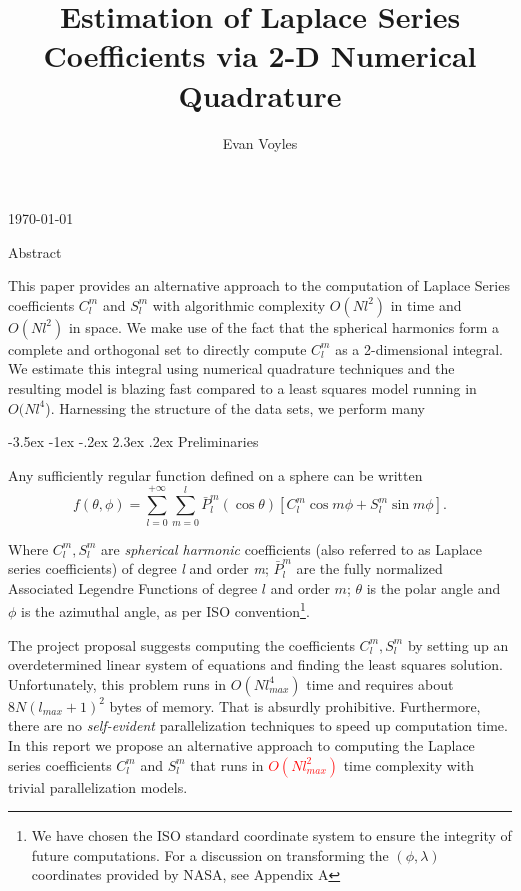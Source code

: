 \documentclass[a4paper]{article}
\title{\Large Estimation of Laplace Series Coefficients via 2-D Numerical Quadrature}
\author{Evan Voyles}
\date{}
\makeatletter
\renewcommand\section{\@startsection{section}{1}{\z@}%
                                  {-3.5ex \@plus -1ex \@minus -.2ex}%
                                  {2.3ex \@plus.2ex}%
                                  {\normalfont\normalsize\bfseries}}
\theoremstyle{definition}
\makeatother
\begin{document}
\makeatletter
\maketitle
\begin{center}
    \vspace{-.2in}
    \today
\end{center}
\makeatother

\newenvironment{norm}{
    \normalfont
}


\section{Abstract}

This paper provides an alternative approach to the computation
of Laplace Series coefficients $C_l^m$ and $S_l^m$ with algorithmic complexity $O(Nl^2)$ in time and $O(Nl^2)$ in space. We 
make use of the fact that the spherical harmonics form a complete and orthogonal set to directly
compute $C_l^m$ as a 2-dimensional integral. We estimate this integral using numerical quadrature techniques
and the resulting model is blazing fast compared to a least squares model running in $O(Nl^4$). Harnessing the structure of the 
data sets, we perform many 



\section{Preliminaries}

Any sufficiently regular function defined on a sphere can be written
\begin{equation} \label{eq:f_iso}
    f(\theta, \phi) = \sum_{l = 0}^{+\infty}\sum_{m = 0}^l \bar P_l^m(\cos\theta)[C_l^m\cos m\phi + S_l^m \sin m \phi].
\end{equation}

Where $C_l^m, S_l^m$ are \textit{spherical harmonic} coefficients (also referred to as Laplace series coefficients) of 
degree \textit{l} and order \textit{m}; $\bar P_l^m$ are the fully normalized Associated Legendre Functions of degree $l$ and order $m$;
$\theta$ is the polar angle and $\phi$ is the azimuthal angle, as per ISO convention\footnote{We have chosen the ISO standard coordinate system to 
ensure the integrity of future computations. For a discussion on transforming the $(\phi, \lambda)$ coordinates provided by NASA, see Appendix A}.

The project proposal suggests computing the coefficients $C_l^m, S_l^m$ by setting up an overdetermined linear system of equations and finding the least squares
solution. Unfortunately, this problem runs in $O(Nl_{max}^4)$ time and requires about $8N(l_{max} + 1)^2$ bytes of memory. That is absurdly prohibitive. Furthermore, there 
are no \textit{self-evident} parallelization techniques to speed up computation time. In this report we propose an alternative approach to computing the Laplace series coefficients
$C_l^m$ and $S_l^m$ that runs in \textcolor{red}{$O(Nl_{max}^2)$} time complexity with trivial parallelization models.
\end{document}
